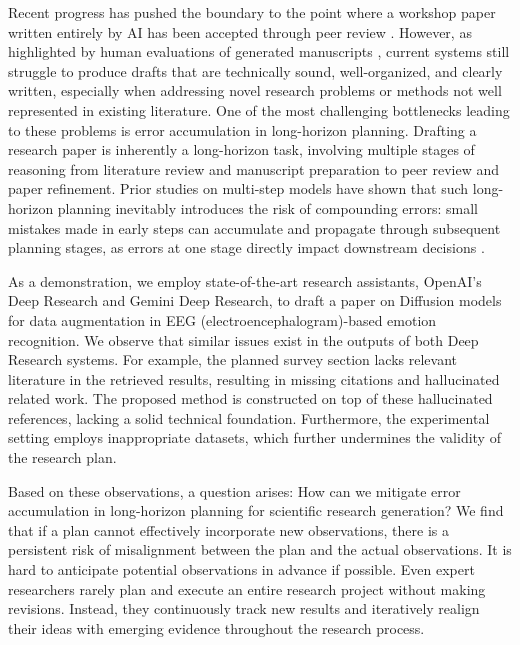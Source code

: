 \documentclass[manuscript,review,anonymous]{acmart}
\begin{document}
Recent progress has pushed the boundary to the point where a workshop paper written entirely by AI has been accepted through peer review \cite{yamada2025ai}. However, as highlighted by human evaluations of generated manuscripts \cite{yamada2025ai}, current systems still struggle to produce drafts that are technically sound, well-organized, and clearly written, especially when addressing novel research problems or methods not well represented in existing literature. One of the most challenging bottlenecks leading to these problems is error accumulation in long-horizon planning. Drafting a research paper is inherently a long-horizon task, involving multiple stages of reasoning from literature review and manuscript preparation to peer review and paper refinement. Prior studies on multi-step models have shown that such long-horizon planning inevitably introduces the risk of compounding errors: small mistakes made in early steps can accumulate and propagate through subsequent planning stages, as errors at one stage directly impact downstream decisions \cite{wang2025expressive, han2023expert, venkatraman2015improving, hejna2023improving}.

As a demonstration, we employ state-of-the-art research assistants, OpenAI's Deep Research \cite{openai2025gpt41} and Gemini Deep Research, to draft a paper on Diffusion models for data augmentation in EEG (electroencephalogram)-based emotion recognition. We observe that similar issues exist in the outputs of both Deep Research systems. For example, the planned survey section lacks relevant literature in the retrieved results, resulting in missing citations and hallucinated related work. The proposed method is constructed on top of these hallucinated references, lacking a solid technical foundation. Furthermore, the experimental setting employs inappropriate datasets, which further undermines the validity of the research plan.

Based on these observations, a question arises: How can we mitigate error accumulation in long-horizon planning for scientific research generation? We find that if a plan cannot effectively incorporate new observations, there is a persistent risk of misalignment between the plan and the actual observations. It is hard to anticipate potential observations in advance if possible. Even expert researchers rarely plan and execute an entire research project without making revisions. Instead, they continuously track new results and iteratively realign their ideas with emerging evidence throughout the research process.
\end{document}
